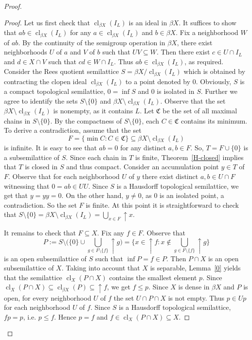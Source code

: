 \documentclass[12pt, twoside, leqno]{article}
\theoremstyle{definition}
\numberwithin{equation}{section}
\newcommand{\cl}{\operatorname{cl}}
\begin{document}
\begin{proof}
\begin{proof}
Let us first check that $\cl_{\beta X}(I_L)$ is an ideal in $\beta X$. It suffices to show that $ab\in \cl_{\beta X}(I_L)$ for any $a\in \cl_{\beta X}(I_L)$ and $b\in\beta X$. Fix a neighborhood $W$ of $ab$. By the continuity of the semigroup operation in $\beta X$, there exist neighborhoods $U$ of $a$ and $V$ of $b$ such that $UV\subseteq W$. Then there exist $c\in U\cap I_L$ and $d\in X\cap V$ such that $cd\in W\cap I_L$. Thus $ab\in \cl_{\beta X}(I_L)$, as required. 
Consider the Rees quotient semilattice $S=\beta X/{\cl_{\beta X}(I_L)}$ which is obtained by contracting the clopen ideal $\cl_{\beta X}(I_L)$ to a point denoted by $0$. Obviously, $S$ is a compact topological semilattice, $0=\inf S$ and $0$ is isolated in $S$. Further we agree to identify the sets $S\setminus\{0\}$ and $\beta X\setminus \cl_{\beta X}(I_L)$. Observe that the set $\beta X\setminus\cl_{\beta X}(I_L)$ is nonempty, as it contains $L$. Let $\mathfrak C$ be the set of all maximal chains in $S\setminus\{0\}$. By the compactness of $S\setminus\{0\}$, each $C\in\mathfrak C$ contains its minimum. To derive a contradiction, assume that the set 
$$F=\{\min C: C\in\mathfrak C\}\subseteq \beta X\setminus\cl_{\beta X}(I_L)$$ is infinite. It is easy to see that $ab=0$ for any distinct $a,b\in F$. So, $T=F\cup\{0\}$ is a subsemilattice of $S$. Since each chain in $T$ is finite, Theorem~\ref{H-closed} implies that $T$ is closed in $S$ and thus compact. Consider an accumulation point $y\in T$ of $F$. Observe that for each neighborhood $U$ of $y$ there exist distinct $a,b\in U\cap F$ witnessing that $0=ab\in UU$. Since $S$ is a Hausdorff topological semilattice, we get that $y=yy=0$. On the other hand, $y\neq 0$, as $0$ is an isolated point, a contradiction. So the set $F$ is finite.
At this point it is straightforward to check that $S\setminus\{0\}=\beta X\setminus\cl_{\beta X}(I_L)=\bigcup_{x\in F}{\uparrow}x$. 

It remains to check that $F\subseteq X$. Fix any $f\in F$. 
Observe that 
$$P:=S\setminus \big(\{0\}\cup\bigcup_{g\in F\setminus\{f\}}{\uparrow}g\big)=\{x\in{\uparrow}f: x\notin \bigcup_{g\in F\setminus\{f\}}{\uparrow}g\}$$ 
is an open subsemilattice of $S$ such that $\inf P=f\in P$. Then $P\cap X$ is an open subsemilattice of $X$. Taking into account that $X$ is separable, Lemma~\ref{0} yields that the semilattice $\cl_X(P\cap X)$ contains the smallest element $p$. Since $\cl_X(P\cap X)\subseteq \cl_{\beta X}(P)\subseteq {\uparrow}f$, we get $f\leq p$. Since $X$ is dense in $\beta X$ and $P$ is open, for every neighborhood $U$ of $f$ the set $U\cap P\cap X$ is not empty. Thus $p\in Up$ for each neighborhood $U$ of $f$. Since $S$ is a Hausdorff topological semilattice, $fp=p$, i.e. $p\leq f$. Hence $p=f$ and $f\in \cl_X(P\cap X)\subseteq X$.
\end{proof}


\end{proof}
\end{document}
